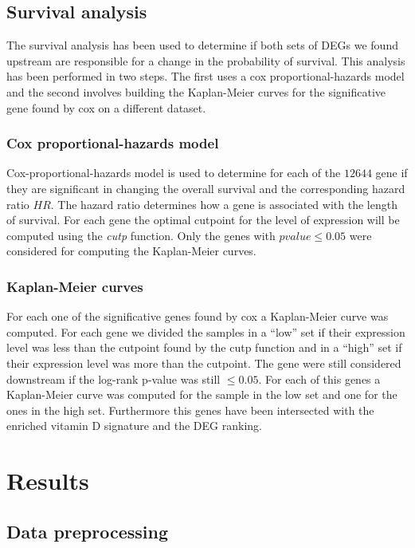 \documentclass[fleqn,10pt]{SelfArx} %
\begin{document}
	\subsection{Survival analysis}
	The survival analysis has been used to determine if both sets of DEGs we found upstream are responsible for a change in the probability of survival.
	This analysis has been performed in two steps.
	The first uses a cox proportional-hazards model and the second involves building the Kaplan-Meier curves for the significative gene found by cox on a different dataset.

		\subsubsection{Cox proportional-hazards model}
		Cox-proportional-hazards model is used to determine for each of the $12644$ gene if they are significant in changing the overall survival and the corresponding hazard ratio $HR$.
		The hazard ratio determines how a gene is associated with the length of survival.
		For each gene the optimal cutpoint for the level of expression will be computed using the \emph{cutp} function.
		Only the genes with $pvalue \le 0.05$ were considered for computing the Kaplan-Meier curves.

		\subsubsection{Kaplan-Meier curves}
		For each one of the significative genes found by cox a Kaplan-Meier curve was computed.
		For each gene we divided the samples in a ``low'' set if their expression level was less than the cutpoint found by the cutp function and in a ``high'' set if their expression level was more than the cutpoint.
		The gene were still considered downstream if the log-rank p-value was still $\le0.05$.
		For each of this genes a Kaplan-Meier curve was computed for the sample in the low set and one for the ones in the high set.
		Furthermore this genes have been intersected with the enriched vitamin D signature and the DEG ranking.

\section{Results}

	\subsection{Data preprocessing}
\end{document}
